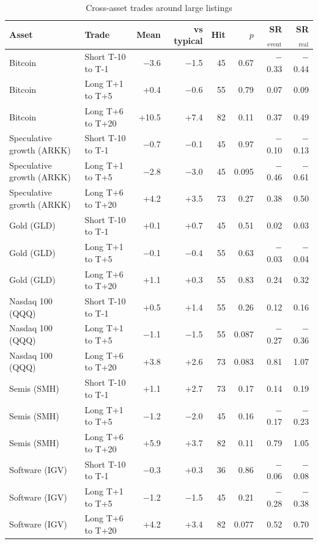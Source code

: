 \begin{table}[!htbp]\centering\scriptsize
\caption{Cross-asset trades around large listings}\label{tab:xtrades}

\begin{threeparttable}
\begin{tabular}{llrrrrrr}
\toprule
Asset & Trade & Mean & vs typical & Hit & $p$ & SR$_\text{event}$ & SR$_\text{real}$ \\
\midrule
Bitcoin & Short T-10 to T-1 & $-$3.6 & $-$1.5 & 45 & 0.67 & $-$0.33 & $-$0.44 \\
Bitcoin & Long T+1 to T+5 & +0.4 & $-$0.6 & 55 & 0.79 & 0.07 & 0.09 \\
Bitcoin & Long T+6 to T+20 & +10.5 & +7.4 & 82 & 0.11 & 0.37 & 0.49 \\
Speculative growth (ARKK) & Short T-10 to T-1 & $-$0.7 & $-$0.1 & 45 & 0.97 & $-$0.10 & $-$0.13 \\
Speculative growth (ARKK) & Long T+1 to T+5 & $-$2.8 & $-$3.0 & 45 & 0.095 & $-$0.46 & $-$0.61 \\
Speculative growth (ARKK) & Long T+6 to T+20 & +4.2 & +3.5 & 73 & 0.27 & 0.38 & 0.50 \\
Gold (GLD) & Short T-10 to T-1 & +0.1 & +0.7 & 45 & 0.51 & 0.02 & 0.03 \\
Gold (GLD) & Long T+1 to T+5 & $-$0.1 & $-$0.4 & 55 & 0.63 & $-$0.03 & $-$0.04 \\
Gold (GLD) & Long T+6 to T+20 & +1.1 & +0.3 & 55 & 0.83 & 0.24 & 0.32 \\
Nasdaq 100 (QQQ) & Short T-10 to T-1 & +0.5 & +1.4 & 55 & 0.26 & 0.12 & 0.16 \\
Nasdaq 100 (QQQ) & Long T+1 to T+5 & $-$1.1 & $-$1.5 & 55 & 0.087 & $-$0.27 & $-$0.36 \\
Nasdaq 100 (QQQ) & Long T+6 to T+20 & +3.8 & +2.6 & 73 & 0.083 & 0.81 & 1.07 \\
Semis (SMH) & Short T-10 to T-1 & +1.1 & +2.7 & 73 & 0.17 & 0.14 & 0.19 \\
Semis (SMH) & Long T+1 to T+5 & $-$1.2 & $-$2.0 & 45 & 0.16 & $-$0.17 & $-$0.23 \\
Semis (SMH) & Long T+6 to T+20 & +5.9 & +3.7 & 82 & 0.11 & 0.79 & 1.05 \\
Software (IGV) & Short T-10 to T-1 & $-$0.3 & +0.3 & 36 & 0.86 & $-$0.06 & $-$0.08 \\
Software (IGV) & Long T+1 to T+5 & $-$1.2 & $-$1.5 & 45 & 0.21 & $-$0.28 & $-$0.38 \\
Software (IGV) & Long T+6 to T+20 & +4.2 & +3.4 & 82 & 0.077 & 0.52 & 0.70 \\

\end{tabular}
\end{threeparttable}
\end{table}
